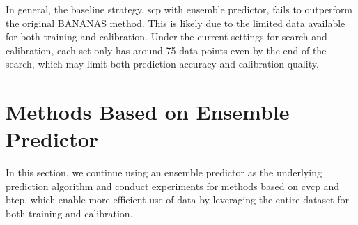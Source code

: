 \documentclass[a4paper,oneside,bibliography=totoc]{scrbook}
\begin{document}
In general, the baseline strategy, \gls{scp} with ensemble predictor, fails to outperform the original BANANAS method. This is likely due to the limited data available for both training and calibration. Under the current settings for search and calibration, each set only has around 75 data points even by the end of the search, which may limit both prediction accuracy and calibration quality. 

\section{Methods Based on Ensemble Predictor}
\label{sec: ensemble}
In this section, we continue using an ensemble predictor as the underlying prediction algorithm and conduct experiments for methods based on \gls{cvcp} and \gls{btcp}, which enable more efficient use of data by leveraging the entire dataset for both training and calibration.
\end{document}
